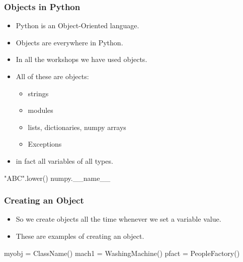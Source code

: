 \documentclass{beamer}
\begin{document}
\begin{frame}[fragile]
\frametitle{Objects in Python}
\begin{itemize}
\item Python is an Object-Oriented language.
\item Objects are everywhere in Python.
\item In all the workshops we have used objects.
\item All of these are objects:
\begin{itemize}
\item strings
\item modules
\item lists, dictionaries, numpy arrays
\item Exceptions
\end{itemize}
\item in fact all variables of all types.
\end{itemize}
\begin{code}
"ABC".lower()
numpy.__name__
\end{code}
\end{frame}

\begin{frame}[fragile]
\frametitle{Creating an Object}
\begin{itemize}
\item So we create objects all the time whenever we set a variable value.
\item These are examples of creating an object.
\end{itemize}

\begin{code}
myobj = ClassName()
mach1 = WashingMachine()
pfact = PeopleFactory()
\end{code}

\end{frame}
\end{document}
